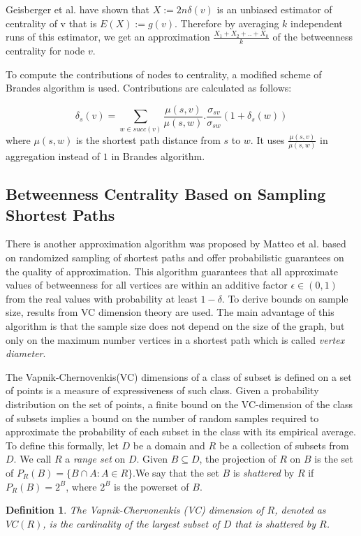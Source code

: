 \documentclass[runningheads,a4paper]{llncs}
\newtheorem{mydef}{Definition}
\begin{document}
Geisberger et al. \cite{sanders} have shown that $X := 2n\delta(v)$ is an unbiased estimator of centrality of v that is $E(X) := g(v)$. Therefore by averaging $k$ independent runs of this estimator, we get an approximation $\frac{X_{1}+X_{2}+..+X_{k}}{k}$ of the betweenness centrality for node $v$. 

To compute the contributions of nodes to centrality, a modified scheme of Brandes algorithm is used. Contributions are calculated as follows:

$$\delta_{s}(v) = \sum_{w \in succ(v)} \frac{\mu(s,v)}{\mu(s,w)}.\frac{\sigma_{sv}}{\sigma_{sw}}(1+\delta_{s}(w))$$
where $\mu(s,w)$ is the shortest path distance from $s$ to $w$. It uses $\frac{\mu(s,v)}{\mu(s,w)}$ in aggregation instead of $1$ in Brandes algorithm. 

\subsection*{Betweenness Centrality Based on Sampling Shortest Paths}
There  is another approximation algorithm was proposed by Matteo et al. \cite{matteo} based on randomized sampling of shortest paths and offer probabilistic guarantees on the quality of approximation. This algorithm guarantees that all approximate values of betweenness for all vertices are within an additive factor $\epsilon \in (0,1)$ from the real values with probability at least $1-\delta$. To derive bounds on sample size, results from VC dimension\cite{vc} theory are used. The main advantage of this algorithm is that the sample size does not depend on the size of the graph, but only on the maximum number vertices in a shortest path which is called \textit{vertex diameter}.  

The Vapnik-Chernovenkis(VC) dimensions of a class of subset is defined on a set of points is a measure of expressiveness of such class. Given a probability distribution on the set of points, a finite bound on the VC-dimension of the class of subsets implies a bound on the number of random samples required to approximate the probability of each subset in the class with its empirical average. To define this formally, let $D$ be a domain and $R$ be a collection of subsets from $D$. We call $R$ a \textit{range set} on $D$. Given $B \subseteq D$, the projection of $R$ on $B$ is the set of $P_{R}(B) = \{B \cap A : A \in R\}$.We say that the set $B$ is \textit{shattered} by $R$ if $P_{R}(B) = 2^{B}$, where $2^{B}$ is the powerset of $B$.

\begin{mydef}
The \textit{Vapnik-Chervonenkis} (VC) dimension of $R$, denoted as $VC(R)$, is the cardinality of the largest subset of $D$ that is shattered by $R$.
\end{mydef}
\end{document}
